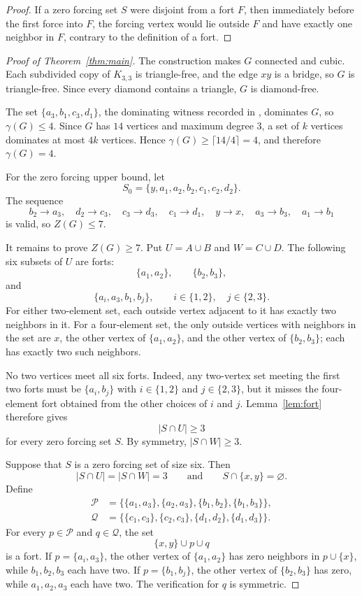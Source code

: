 \documentclass[11pt]{amsart}
\begin{document}
\begin{proof}
If a zero forcing set $S$ were disjoint from a fort $F$, then immediately
before the first force into $F$, the forcing vertex would lie outside $F$ and
have exactly one neighbor in $F$, contrary to the definition of a fort.
\end{proof}

\begin{proof}[Proof of Theorem~\ref{thm:main}]
The construction makes $G$ connected and cubic.  Each subdivided copy of
$K_{3,3}$ is triangle-free, and the edge $xy$ is a bridge, so $G$ is
triangle-free.  Since every diamond contains a triangle, $G$ is
diamond-free.

The set $\{a_3,b_1,c_3,d_1\}$, the dominating witness recorded in
\cite{Erlbacher2026}, dominates $G$, so $\gamma(G)\leq4$.  Since
$G$ has $14$ vertices and maximum degree $3$, a set of $k$ vertices dominates
at most $4k$ vertices.  Hence $\gamma(G)\geq\lceil14/4\rceil=4$, and therefore
$\gamma(G)=4$.

For the zero forcing upper bound, let
\[
  S_0=\{y,a_1,a_2,b_2,c_1,c_2,d_2\}.
\]
The sequence
\[
 b_2\to a_3,\quad
 d_2\to c_3,\quad
 c_3\to d_3,\quad
 c_1\to d_1,\quad
 y\to x,\quad
 a_3\to b_3,\quad
 a_1\to b_1
\]
is valid, so $Z(G)\leq7$.

It remains to prove $Z(G)\geq7$.  Put $U=A\cup B$ and $W=C\cup D$.  The
following six subsets of $U$ are forts:
\[
 \{a_1,a_2\},\qquad \{b_2,b_3\},
\]
and
\[
 \{a_i,a_3,b_1,b_j\},
 \qquad i\in\{1,2\},\quad j\in\{2,3\}.
\]
For either two-element set, each outside vertex adjacent to it has exactly
two neighbors in it.  For a four-element set, the only outside vertices with
neighbors in the set are $x$, the other vertex of $\{a_1,a_2\}$, and the
other vertex of $\{b_2,b_3\}$; each has exactly two such neighbors.

No two vertices meet all six forts.  Indeed, any two-vertex set meeting the
first two forts must be $\{a_i,b_j\}$ with $i\in\{1,2\}$ and
$j\in\{2,3\}$, but it misses the four-element fort obtained from the other
choices of $i$ and $j$.  Lemma~\ref{lem:fort} therefore gives
\[
  |S\cap U|\geq3
\]
for every zero forcing set $S$.  By symmetry, $|S\cap W|\geq3$.

Suppose that $S$ is a zero forcing set of size six.  Then
\[
 |S\cap U|=|S\cap W|=3
 \qquad\text{and}\qquad
 S\cap\{x,y\}=\varnothing.
\]
Define
\[
\begin{aligned}
 \mathcal P&=\bigl\{\{a_1,a_3\},\{a_2,a_3\},
                    \{b_1,b_2\},\{b_1,b_3\}\bigr\},\\
 \mathcal Q&=\bigl\{\{c_1,c_3\},\{c_2,c_3\},
                    \{d_1,d_2\},\{d_1,d_3\}\bigr\}.
\end{aligned}
\]
For every $p\in\mathcal P$ and $q\in\mathcal Q$, the set
\[
  \{x,y\}\cup p\cup q
\]
is a fort.  If $p=\{a_i,a_3\}$, the other vertex of $\{a_1,a_2\}$ has
zero neighbors in $p\cup\{x\}$, while $b_1,b_2,b_3$ each have two.  If
$p=\{b_1,b_j\}$, the other vertex of $\{b_2,b_3\}$ has zero, while
$a_1,a_2,a_3$ each have two.  The verification for $q$ is symmetric.


\end{proof}
\end{document}
